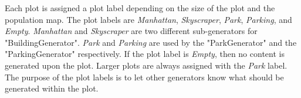 Each plot is assigned a plot label depending on the size of the plot and the population map.
The plot labels are \textit{Manhattan}, \textit{Skyscraper}, \textit{Park}, \textit{Parking}, and \textit{Empty}.
\textit{Manhattan} and \textit{Skyscraper} are two different sub-generators for "BuildingGenerator". 
\textit{Park} and \textit{Parking} are used by the "ParkGenerator" and the "ParkingGenerator" respectively.
If the plot label is \textit{Empty}, then no content is generated upon the plot.
Larger plots are always assigned with the \textit{Park} label.
The purpose of the plot labels is to let other generators know what should be generated within the plot.